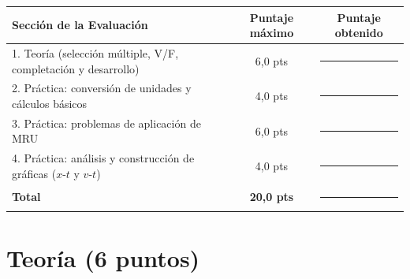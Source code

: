 \documentclass[12pt, letterpaper]{article}
\begin{document}
\begin{center}
  \vspace{-6pt}
  \small
  \renewcommand{\arraystretch}{1.0}
  \begin{tabular}{@{}l cc@{}}
    \toprule
    \textbf{Sección de la Evaluación} & \textbf{Puntaje máximo} & \textbf{Puntaje obtenido} \\
    \midrule
    1. Teoría (selección múltiple, V/F, completación y desarrollo) & 6,0 pts  & \rule{2.0cm}{0.4pt} \\
    2. Práctica: conversión de unidades y cálculos básicos         & 4,0 pts  & \rule{2.0cm}{0.4pt} \\
    3. Práctica: problemas de aplicación de MRU                    & 6,0 pts  & \rule{2.0cm}{0.4pt} \\
    4. Práctica: análisis y construcción de gráficas ($x$-$t$ y $v$-$t$) & 4,0 pts & \rule{2.0cm}{0.4pt} \\
    \midrule
    \textbf{Total}                                                 & \textbf{20,0 pts} & \rule{2.0cm}{0.4pt} \\
    \bottomrule
  \end{tabular}
  \vspace{-8pt}
\end{center}

\section{Teoría (6 puntos)}
\end{document}
